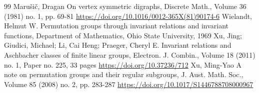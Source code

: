 \begin{thebibliography}{99}
 Marušič, Dragan On vertex symmetric digraphs, Discrete Math., Volume 36 (1981) no. 1, pp. 69-81 \url{https://doi.org/10.1016/0012-365X(81)90174-6}
 Wielandt, Helmut W. Permutation groups through invariant relations and invariant functions, Department of Mathematics, Ohio State University, 1969
 Xu, Jing; Giudici, Michael; Li, Cai Heng; Praeger, Cheryl E. Invariant relations and Aschbacher classes of finite linear groups, Electron. J. Combin., Volume 18 (2011) no. 1, Paper no. 225, 33 pages \url{https://doi.org/10.37236/712}
 Xu, Ming-Yao A note on permutation groups and their regular subgroups, J. Aust. Math. Soc., Volume 85 (2008) no. 2, pp. 283-287 \url{https://doi.org/10.1017/S1446788708000967}
\end{thebibliography}
